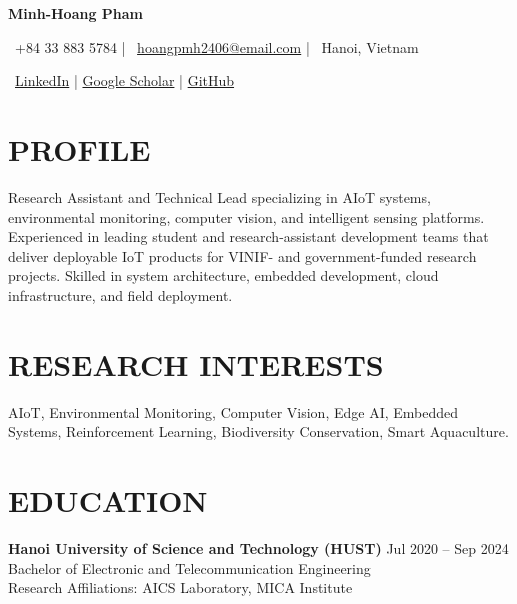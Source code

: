 \documentclass[letterpaper,11pt]{article}
\begin{document}

\begin{center}

{\Huge \textbf{Minh-Hoang Pham}}

\vspace{6pt}

\faPhone* \ +84 33 883 5784
\quad|\quad
\faEnvelope \ \href{mailto:hoangpmh2406@email.com}{hoangpmh2406@email.com}
\quad|\quad
\faMapMarker* \ Hanoi, Vietnam

\vspace{4pt}

\faLinkedin \
\href{https://www.linkedin.com/in/minh-ho%C3%A0ng-ph%E1%BA%A1m-609026191/}{LinkedIn}
\quad|\quad
\faGraduationCap 
\href{https://scholar.google.com/citations?user=LY2TOAcAAAAJ}{Google Scholar}
\quad|\quad
\faGithub 
\href{https://github.com/Hoang-PM-7604119}{GitHub}

\end{center}


\section{PROFILE}
Research Assistant and Technical Lead specializing in AIoT systems, environmental monitoring, computer vision, and intelligent sensing platforms. Experienced in leading student and research-assistant development teams that deliver deployable IoT products for VINIF- and government-funded research projects. Skilled in system architecture, embedded development, cloud infrastructure, and field deployment.

\section{RESEARCH INTERESTS}
AIoT, Environmental Monitoring, Computer Vision, Edge AI, Embedded Systems, Reinforcement Learning, Biodiversity Conservation, Smart Aquaculture.

\section{EDUCATION}
\textbf{Hanoi University of Science and Technology (HUST)} \hfill Jul 2020 -- Sep 2024\\
Bachelor of Electronic and Telecommunication Engineering\\
Research Affiliations: AICS Laboratory, MICA Institute
\end{document}

